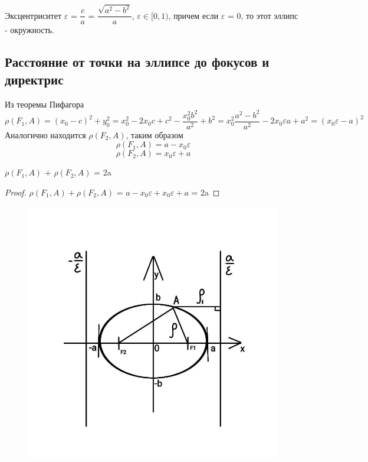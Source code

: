 Эксцентриситет $\varepsilon$ = $\dfrac{c}{a}$ = $\dfrac{\sqrt{a^2 - b^2}}{a}$, $\varepsilon\in[0, 1)$, причем если $\varepsilon$ = 0, то этот эллипс - окружность.\\

\subsection{Расстояние от точки на эллипсе до фокусов и директрис}

Из теоремы Пифагора
\[
\rho(F_1, A) = (x_0 - c)^2 + y_0^2 = x_0^2 - 2x_0c + c^2 - \dfrac{x_0^2b^2}{a^2} + b^2 = x_0^2 \dfrac{a^2 - b^2}{a^2} - 2x_0\varepsilon a + a^2 = (x_0\varepsilon - a)^2
\]
Аналогично находится $\rho(F_2, A)$, таким образом
\[
\rho(F_1, A) = a - x_0\varepsilon
\]
\[
\rho(F_2, A) = x_0\varepsilon + a
\]

\begin{theorem}
    $\rho(F_1, A)$ + $\rho(F_2, A)$ = 2a
\end{theorem}
\begin{proof}
    $\rho(F_1, A) + \rho(F_2, A)$ = $a - x_0\varepsilon + x_0\varepsilon + a$ = 2a
\end{proof}

\begin{figure}
    \includegraphics[width=1.0\linewidth]{images/эллипс2.jpeg}
\end{figure}

